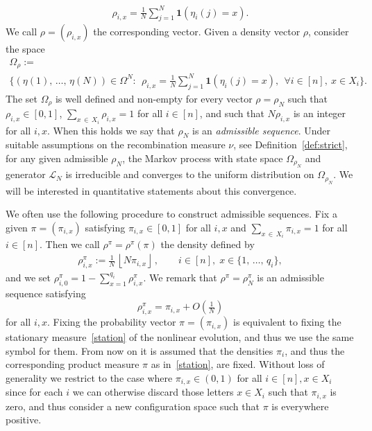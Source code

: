 \documentclass[AHL,Unicode,longabstracts,published]{cedram}
\newcommand{\Om}{\Omega}
\newcommand{\rhoN}{\rho^{\pi}}
\newcommand{\ind}{\mathbf{1}}
\newcommand{\cL}{\mathcal{L}}
\let\r=\rho
\let\O=\Omega
\let\oldforall\forall
\renewcommand*{\forall}{\mathrel{\oldforall}}
\begin{document}
\begin{align*}
\rho_{i,x} = \frac{1}{N}\sum_{j=1}^N\ind(\eta_i(j) = x).
\end{align*}
We call $\rho = (\rho_{i,x})$ the corresponding vector. Given a density vector $\rho$, consider the space
\begin{multline}\label{omegarhosets}
\Omega_{\rho} := \\
\Big\{(\eta(1),\,\dots,\,\eta(N)) \in \Om^N \!\!:\, \;
\textstyle{\rho_{i,x} = \frac{1}{N}\sum_{j=1}^N \ind(\eta_i(j) = x)},\;\, \forall i \in [n], \ x \in X_i\Big\}.
\end{multline}
The set $\Om_{\rho}$ is well defined and non-empty for every vector $\r=\r_N$ such that $\r_{i,x}\in[0,1]$, $\sum_{x\,\in\,X_i}\r_{i,x}=1$ for all $i\in[n]$, and such that $N\r_{i,x}$ is an integer for all $i,x$. When this holds we say that $\r_N$ is an \emph{admissible sequence}. Under suitable assumptions on the recombination measure $\nu$, see Definition~\ref{def:strict}, for any given admissible $\r_N$, the Markov process with state space $\O_{\r_N}$ and generator $\cL_N$ is irreducible and converges to the uniform distribution on $\O_{\r_N}$. We will be interested in quantitative statements about this convergence.

We often use the following procedure to construct admissible sequences. Fix a given $\pi=(\pi_{i,x})$ satisfying $\pi_{i,x}\in[0,1]$ for all $i,x$ and $\sum_{x\,\in\,X_i}\pi_{i,x}=1$ for all $i\in[n]$. Then we call $\rhoN=\rhoN(\pi)$ the density defined by
\begin{align}\label{rhoseq}
\rhoN_{i,x} :=\tfrac1N\,{\left\lfloor N \pi_{i,x}\right\rfloor}\,, \qquad i\in[n], \;x\in \{1,\,\dots,\,q_i\},
\end{align}
and we set $ \rhoN_{i,0}=1-\sum_{x=1}^{q_i}\rhoN_{i,x}$.
We remark that $\rhoN=\rhoN_N$ is an admissible sequence satisfying
\[
\rhoN_{i,x}=\pi_{i,x} +O\left(\tfrac1N\right)
\]
for all $i,x$.
Fixing the probability vector $\pi=(\pi_{i,x})$ is equivalent to fixing the stationary measure~\eqref{station} of the nonlinear evolution, and thus we use the same symbol for them. From now on it is assumed that the densities $\pi_i$, and thus the corresponding product measure $\pi$ as in~\eqref{station}, are fixed. Without loss of generality we restrict to the case where $\pi_{i,x} \in(0,1)$ for all $i \in [n],x\in X_i$ since for each $i$ we can otherwise discard those letters $x\in X_i$ such that $\pi_{i,x}$ is zero, and thus consider a new configuration space such that $\pi$ is everywhere positive.
\end{document}
